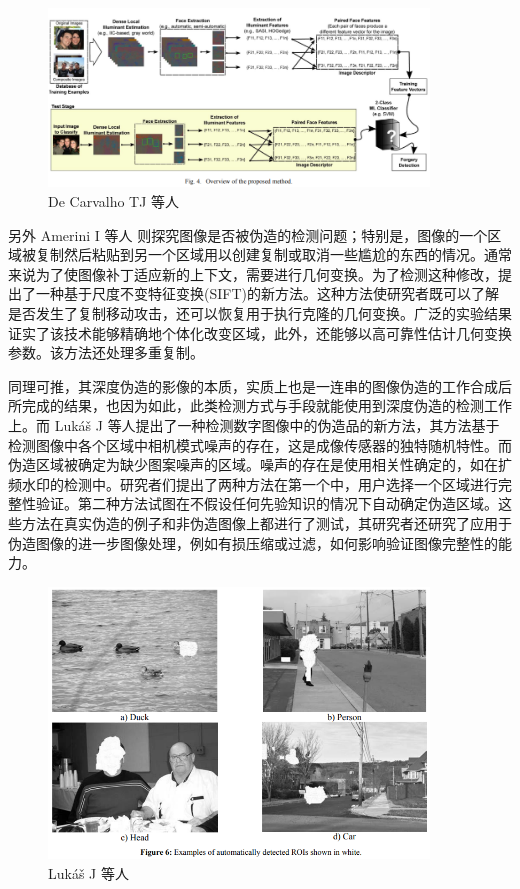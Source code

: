 \begin{figure}[htb]
\centering 
\includegraphics[width=0.90\textwidth]{img/ch3m2.png} 
\caption{De Carvalho TJ 等人 \cite{de2013exposing}}
\label{Test}
\end{figure}

另外  Amerini I 等人 \cite{amerini2011sift} 则探究图像是否被伪造的检测问题；特别是，图像的一个区域被复制然后粘贴到另一个区域用以创建复制或取消一些尴尬的东西的情况。通常来说为了使图像补丁适应新的上下文，需要进行几何变换。为了检测这种修改，提出了一种基于尺度不变特征变换(SIFT)的新方法。这种方法使研究者既可以了解是否发生了复制移动攻击，还可以恢复用于执行克隆的几何变换。广泛的实验结果证实了该技术能够精确地个体化改变区域，此外，还能够以高可靠性估计几何变换参数。该方法还处理多重复制。

同理可推，其深度伪造的影像的本质，实质上也是一连串的图像伪造的工作合成后所完成的结果，也因为如此，此类检测方式与手段就能使用到深度伪造的检测工作上。而 Lukáš J \cite{lukavs2006detecting} 等人提出了一种检测数字图像中的伪造品的新方法，其方法基于检测图像中各个区域中相机模式噪声的存在，这是成像传感器的独特随机特性。而伪造区域被确定为缺少图案噪声的区域。噪声的存在是使用相关性确定的，如在扩频水印的检测中。研究者们提出了两种方法在第一个中，用户选择一个区域进行完整性验证。第二种方法试图在不假设任何先验知识的情况下自动确定伪造区域。这些方法在真实伪造的例子和非伪造图像上都进行了测试，其研究者还研究了应用于伪造图像的进一步图像处理，例如有损压缩或过滤，如何影响验证图像完整性的能力。

\begin{figure}[htb]
\centering 
\includegraphics[width=0.90\textwidth]{img/ch3m3.png} 
\caption{Lukáš J 等人 \cite{lukavs2006detecting}}
\label{Test}
\end{figure}

